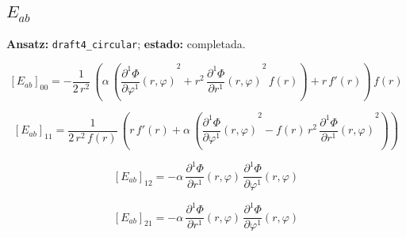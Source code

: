 \documentclass[11pt]{article}
\begin{document}
\subsection*{$ E_{ab} $}
\textbf{Ansatz:} \texttt{draft4\_circular}; \textbf{estado:} completada.\par
\begin{dmath*}[breakdepth={5}]
\left[E_{ab}\right]_{00} = -\frac{1}{2\,{r}^{2}}\,\left(\alpha\,\left({\frac{\partial^{1} \Phi}{\partial \varphi^{1}}\!\left(r, \varphi\right)}^{2} + {r}^{2}\,{\frac{\partial^{1} \Phi}{\partial r^{1}}\!\left(r, \varphi\right)}^{2}\,f\!\left(r\right)\right) + r\,f'\!\left(r\right)\right)\,f\!\left(r\right)
\end{dmath*}
\par\smallskip
\begin{dmath*}[breakdepth={5}]
\left[E_{ab}\right]_{11} = \frac{1}{2\,{r}^{2}\,f\!\left(r\right)}\,\left(r\,f'\!\left(r\right) + \alpha\,\left({\frac{\partial^{1} \Phi}{\partial \varphi^{1}}\!\left(r, \varphi\right)}^{2} - f\!\left(r\right)\,{r}^{2}\,{\frac{\partial^{1} \Phi}{\partial r^{1}}\!\left(r, \varphi\right)}^{2}\right)\right)
\end{dmath*}
\par\smallskip
\begin{dmath*}[breakdepth={5}]
\left[E_{ab}\right]_{12} = -\alpha\,\frac{\partial^{1} \Phi}{\partial r^{1}}\!\left(r, \varphi\right)\,\frac{\partial^{1} \Phi}{\partial \varphi^{1}}\!\left(r, \varphi\right)
\end{dmath*}
\par\smallskip
\begin{dmath*}[breakdepth={5}]
\left[E_{ab}\right]_{21} = -\alpha\,\frac{\partial^{1} \Phi}{\partial r^{1}}\!\left(r, \varphi\right)\,\frac{\partial^{1} \Phi}{\partial \varphi^{1}}\!\left(r, \varphi\right)
\end{dmath*}
\par\smallskip
\end{document}
